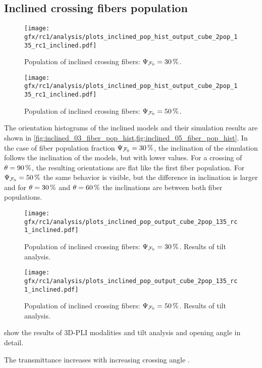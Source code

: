 \subsection{Inclined crossing fibers population}
\label{sec:resInclCross}
%
\begin{figure}[!p]
\centering
\texttt{[image: gfx/rc1/analysis/plots\_inclined\_pop\_hist\_output\_cube\_2pop\_135\_rc1\_inclined.pdf]}
\caption{Population of inclined crossing fibers: $\textnormal{$\Psi_{\textnormal{$\mathcal{F}_0$}}$}=\SI{30}{\percent}$.
}
\label{fig:inclined_03_fiber_pop_hist}
% 
\vspace{2em}
\texttt{[image: gfx/rc1/analysis/plots\_inclined\_pop\_hist\_output\_cube\_2pop\_135\_rc1\_inclined.pdf]}
\caption{Population of inclined crossing fibers: $\textnormal{$\Psi_{\textnormal{$\mathcal{F}_0$}}$}=\SI{50}{\percent}$.
}
\label{fig:inclined_05_fiber_pop_hist}
\end{figure}
%
The orientation histograms of the inclined models and their simulation results are shown in \cref{fig:inclined_03_fiber_pop_hist,fig:inclined_05_fiber_pop_hist}.
In the case of fiber population fraction $\textnormal{$\Psi_{\textnormal{$\mathcal{F}_0$}}$}=\SI{30}{\percent}$, the inclination of the simulation follows the inclination of the models, but with lower values.
For a crossing of $\textnormal{$\theta$}=\SI{90}{\percent}$, the resulting orientations are flat like the first fiber population.
For $\textnormal{$\Psi_{\textnormal{$\mathcal{F}_0$}}$}=\SI{50}{\percent}$ the same behavior is visible, but the difference in inclination is larger and for $\textnormal{$\theta$}=\SI{30}{\percent}$ and $\textnormal{$\theta$}=\SI{60}{\percent}$ the inclinations are between both fiber populations.
\par
%
\begin{figure}[!p]
\centering
\texttt{[image: gfx/rc1/analysis/plots\_inclined\_pop\_output\_cube\_2pop\_135\_rc1\_inclined.pdf]}
\caption{Population of inclined crossing fibers: $\textnormal{$\Psi_{\textnormal{$\mathcal{F}_0$}}$}=\SI{30}{\percent}$. Results of tilt analysis.}
\label{fig:inclined_03_fiber_pop_rofl}
\end{figure}
%
\begin{figure}[!p]
\centering
\texttt{[image: gfx/rc1/analysis/plots\_inclined\_pop\_output\_cube\_2pop\_135\_rc1\_inclined.pdf]}
\caption{Population of inclined crossing fibers: $\textnormal{$\Psi_{\textnormal{$\mathcal{F}_0$}}$}=\SI{50}{\percent}$. Results of tilt analysis.}
\label{fig:inclined_05_fiber_pop_rofl}
\end{figure}
%
 show the results of \ac{3D-PLI} modalities and tilt analysis and opening angle in detail.
\par
The transmittance increases with increasing crossing angle \modelOmega{}.
